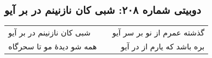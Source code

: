 \begin{center}
\section*{دوبیتی شماره ۲۰۸: شبی کان نازنینم در بر آیو}
\label{sec:208}
\begin{longtable}{l p{0.5cm} r}
شبی کان نازنینم در بر آیو
&&
گذشته عمرم از نو بر سر آیو
\\
همه شو دیدهٔ مو تا سحرگاه
&&
بره باشد که یارم از در آیو
\\
\end{longtable}
\end{center}
